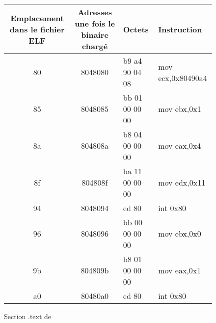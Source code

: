 \begin{figure}
\begin{center}
\end{center}
\end{figure}

\begin{figure}
\begin{center}
\begin{tabular}{|c|c|l|l|}
\hline
Emplacement dans le fichier ELF & Adresses une fois le binaire chargé & Octets & Instruction\\ 
\hline
80 & 8048080 & b9 a4 90 04 08 & mov    ecx,0x80490a4 \\
85 & 8048085 & bb 01 00 00 00 & mov    ebx,0x1       \\
8a & 804808a & b8 04 00 00 00 & mov    eax,0x4       \\
8f & 804808f & ba 11 00 00 00 & mov    edx,0x11      \\
94 & 8048094 & cd 80          & int    0x80          \\
96 & 8048096 & bb 00 00 00 00 & mov    ebx,0x0       \\
9b & 804809b & b8 01 00 00 00 & mov    eax,0x1       \\
a0 & 80480a0 & cd 80          & int    0x80          \\
\hline
\end{tabular}
\end{center}
 
\caption{Section .text de \helloworld}
\label{fig:text_helloworld}
\end{figure}


